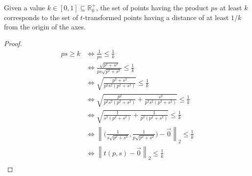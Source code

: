\begin{lemma}
	{Given a value $k\in[0,1]\subseteq \mathbb{R}^+_0$, the set of points having the product $ps$ at least $k$ corresponds to the set of $t$-transformed points having a distance of at least $1/k$ from the origin of the axes.}
\end{lemma}
\begin{proof}
	\[\begin{aligned}
	ps\geq k&{\Leftrightarrow \frac{1}{ps}\leq\frac{1}{k}} \\
	&{\Leftrightarrow \frac{\sqrt{p^2+s^2}}{ps\sqrt{p^2+s^2}}\leq\frac{1}{k} }\\
	&{\Leftrightarrow \sqrt{\frac{p^2+s^2}{p^2s^2(p^2+s^2)}}\leq\frac{1}{k}} \\
	&{\Leftrightarrow \sqrt{\frac{p^2}{p^2s^2(p^2+s^2)}+\frac{s^2}{p^2s^2(p^2+s^2)}}\leq\frac{1}{k}} \\
	&{\Leftrightarrow \sqrt{\frac{1}{s^2(p^2+s^2)}+\frac{1}{p^2(p^2+s^2)}}\leq\frac{1}{k}} \\
	&{\Leftrightarrow \left\|{\biggr({\frac{1}{s\sqrt{p^2+s^2}},\frac{1}{p\sqrt{p^2+s^2}}\biggr)}-\vec{0}}\right\|_2\leq\frac{1}{k}} \\
	&{\Leftrightarrow \left\|t(p,s)-\vec{0}\right\|_2\leq\frac{1}{k}} \\
	\end{aligned}\]
\end{proof}
	
